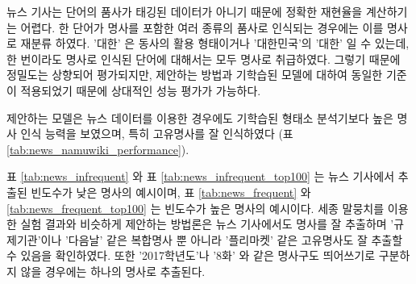 \documentclass[oneside, ko,phd]{snuthesis_utf8_kor}
\begin{document}
뉴스 기사는 단어의 품사가 태깅된 데이터가 아니기 때문에 정확한 재현율을 계산하기는 어렵다.
한 단어가 명사를 포함한 여러 종류의 품사로 인식되는 경우에는 이를 명사로 재분류 하였다.
'대한' 은 동사의 활용 형태이거나 '대한민국'의 '대한' 일 수 있는데, 한 번이라도 명사로 인식된 단어에 대해서는 모두 명사로 취급하였다.
그렇기 때문에 정밀도는 상향되어 평가되지만, 제안하는 방법과 기학습된 모델에 대하여 동일한 기준이 적용되었기 때문에 상대적인 성능 평가가 가능하다.

제안하는 모델은 뉴스 데이터를 이용한 경우에도  기학습된 형태소 분석기보다 높은 명사 인식 능력을 보였으며, 특히 고유명사를 잘 인식하였다 (표 \ref{tab:news_namuwiki_performance}).

표 \ref{tab:news_infrequent} 와 표 \ref{tab:news_infrequent_top100} 는 뉴스 기사에서 추출된 빈도수가 낮은 명사의 예시이며, 표 \ref{tab:news_frequent} 와 \ref{tab:news_frequent_top100} 는 빈도수가 높은 명사의 예시이다.
세종 말뭉치를 이용한 실험 결과와 비슷하게 제안하는 방법론은 뉴스 기사에서도 명사를 잘 추출하며 '규제기관'이나 '다음날' 같은 복합명사 뿐 아니라 '플리마켓' 같은 고유명사도 잘 추출할 수 있음을 확인하였다.
또한 '2017학년도'나 '8화' 와 같은 명사구도 띄어쓰기로 구분하지 않을 경우에는 하나의 명사로 추출된다.

\begin{table}[ht]
\centering
\caption{뉴스 기사에서 명사로 추출된 빈도수가 작은 12 개의 명사 예시 (Logistic Regression 의 판별 확률, 출현 빈도수)}
\label{tab:news_infrequent}
\end{table}

\begin{table}[ht]
\centering
\caption{뉴스 기사에서 명사로 추출된 12 개의 명사 예시 (정렬 기준 = 판별 확률 $\times$ 출현 빈도수)}
\label{tab:news_frequent}
\end{table}
\end{document}
